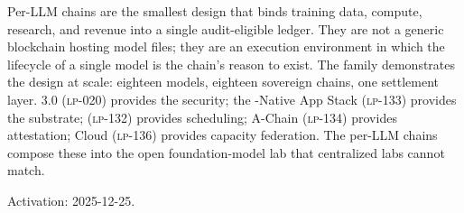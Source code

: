Per-LLM chains are the smallest design that binds training data, compute, research, and revenue into a single audit-eligible ledger. They are not a generic blockchain hosting model files; they are an execution environment in which the lifecycle of a single model is the chain's reason to exist. The \Zen{} family demonstrates the design at scale: eighteen models, eighteen sovereign chains, one settlement layer. \Quasar{} 3.0 (\textsc{lp-020}) provides the security; the \Quasar{}-Native App Stack (\textsc{lp-133}) provides the substrate; \Quasar{}\GPU{} (\textsc{lp-132}) provides scheduling; A-Chain (\textsc{lp-134}) provides attestation; \Lux{} Cloud (\textsc{lp-136}) provides capacity federation. The \Zoo{} per-LLM chains compose these into the open foundation-model lab that centralized labs cannot match.

Activation: 2025-12-25.
